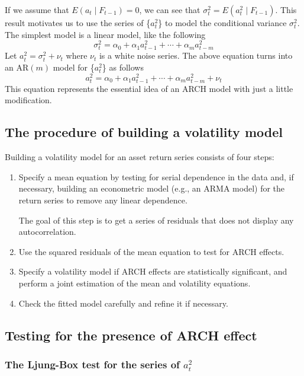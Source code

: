 \documentclass[a4paper,11pt]{article}
\begin{document}
If we assume that \(E(a_t \mid F_{t-1}) = 0\), we can see that
\(\sigma^2_t = E(a^2_t \mid F_{t-1})\). This result motivates us to use
the series of \{\(a^2_t\)\} to model the conditional variance
\(\sigma^2_t\). The simplest model is a linear model, like the following
\[ \sigma^2_t = \alpha_0 + \alpha_1 a^2_{t-1} + \cdots + \alpha_m a^2_{t-m} \]
Let \(a^2_t = \sigma^2_t + \nu_t\) where \(\nu_t\) is a white noise
series. The above equation turns into an AR\((m)\) model for \{\(a^2_t\)\}
as follows
\[a^2_t = \alpha_0 + \alpha_1 a^2_{t-1} + \cdots + \alpha_m
a^2_{t-m} + \nu_t \]
This equation represents the essential idea of an ARCH model with just
a little modification. 


\subsection{The procedure of building a volatility model}
\label{sec:org18ab44f}

Building a volatility model for an asset return series consists of
four steps:

\begin{enumerate}
\item Specify a mean equation by testing for serial dependence in the
data and, if necessary, building an econometric model (e.g., an
ARMA model) for the return series to remove any linear dependence.

The goal of this step is to get a series of residuals that does not
display any autocorrelation.

\item Use the squared residuals of the mean equation to test for ARCH
effects.

\item Specify a volatility model if ARCH effects are statistically
significant, and perform a joint estimation of the mean and
volatility equations.

\item Check the fitted model carefully and refine it if necessary.
\end{enumerate}


\subsection{Testing for the presence of ARCH effect}
\label{sec:orgd21a16d}

\subsubsection*{The Ljung-Box test for the series of \(a^2_t\)}
\label{sec:org0849fa4}
\end{document}
